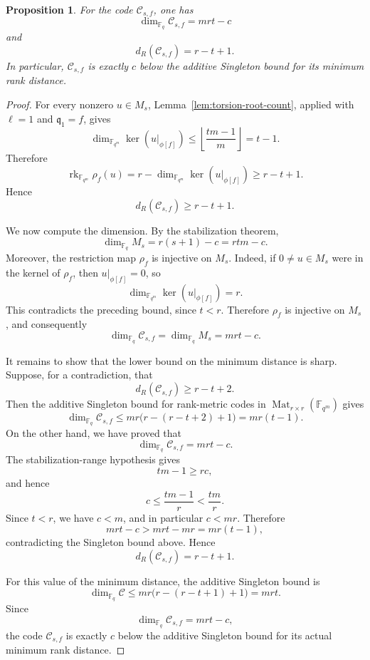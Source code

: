 \documentclass[10pt,a4paper]{amsart}
\newtheorem{proposition}{Proposition}
\DeclareMathOperator{\Mat}{Mat}
\DeclareMathOperator{\rk}{rk}
\newcommand{\vF}{\mathbb F}
\begin{document}
\begin{proposition}
For the code $\mathcal C_{s,f}$, one has
$$
\dim_{\vF_q}\mathcal C_{s,f}=mrt-c
$$
and
$$
d_R(\mathcal C_{s,f})=r-t+1.
$$
In particular, $\mathcal C_{s,f}$ is exactly $c$ below the additive Singleton bound for its minimum rank distance.
\end{proposition}

\begin{proof}
For every nonzero $u\in M_s$, Lemma~\ref{lem:torsion-root-count}, applied
with $\ell=1$ and $\mathfrak q_1=f$, gives
$$
\dim_{\vF_{q^m}}\ker\left(u|_{\phi[f]}\right)
\leq
\left\lfloor\frac{tm-1}{m}\right\rfloor
=t-1.
$$
Therefore
$$
\rk_{\vF_{q^m}}\rho_f(u)
=
r-\dim_{\vF_{q^m}}\ker\left(u|_{\phi[f]}\right)
\geq r-t+1.
$$
Hence
$$
d_R(\mathcal C_{s,f})\geq r-t+1.
$$

We now compute the dimension. By the stabilization theorem,
$$
\dim_{\vF_q}M_s
=
r(s+1)-c
=
rtm-c.
$$
Moreover, the restriction map $\rho_f$ is injective on $M_s$. Indeed, if $0\neq u\in M_s$ were in the kernel of $\rho_f$, then $u|_{\phi[f]}=0$, so
$$
\dim_{\vF_{q^m}}\ker\left(u|_{\phi[f]}\right)=r.
$$
This contradicts the preceding bound, since $t<r$. Therefore $\rho_f$ is injective on $M_s$, and consequently
$$
\dim_{\vF_q}\mathcal C_{s,f}
=
\dim_{\vF_q}M_s
=
mrt-c.
$$

It remains to show that the lower bound on the minimum distance is sharp. Suppose, for a contradiction, that
$$
d_R(\mathcal C_{s,f})\geq r-t+2.
$$
Then the additive Singleton bound for rank-metric codes in $\Mat_{r\times r}(\vF_{q^m})$ gives
$$
\dim_{\vF_q}\mathcal C_{s,f}
\leq
mr\bigl(r-(r-t+2)+1\bigr)
=
mr(t-1).
$$
On the other hand, we have proved that
$$
\dim_{\vF_q}\mathcal C_{s,f}=mrt-c.
$$
The stabilization-range hypothesis gives
$$
tm-1\geq rc,
$$
and hence
$$
c\leq \frac{tm-1}{r}<\frac{tm}{r}.
$$
Since $t<r$, we have $c<m$, and in particular $c<mr$. Therefore
$$
mrt-c>mrt-mr=mr(t-1),
$$
contradicting the Singleton bound above. Hence
$$
d_R(\mathcal C_{s,f})=r-t+1.
$$

For this value of the minimum distance, the additive Singleton bound is
$$
\dim_{\vF_q}\mathcal C\leq mr\bigl(r-(r-t+1)+1\bigr)=mrt.
$$
Since
$$
\dim_{\vF_q}\mathcal C_{s,f}=mrt-c,
$$
the code $\mathcal C_{s,f}$ is exactly $c$ below the additive Singleton bound for its actual minimum rank distance.
\end{proof}
\end{document}
